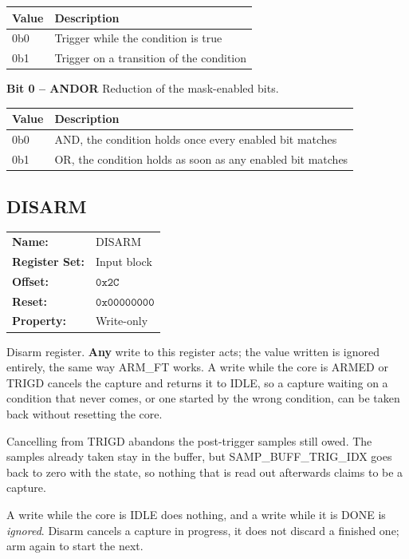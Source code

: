 \documentclass[twocolumn]{article}
\newcommand{\hex}[1]{\ensuremath{\mathtt{0x#1}}}
\newcommand{\regprop}[5]{%
  \begin{tabular}{ll}
    \textbf{Name:}         & #1 \\
    \textbf{Register Set:} & #2 \\
    \textbf{Offset:}       & #3 \\
    \textbf{Reset:}        & #4 \\
    \textbf{Property:}     & #5 \\
  \end{tabular}\par\vspace{0.6em}%
}
\begin{document}
\begin{table}[H]
    \centering
    \begin{tabularx}{\textwidth}{|l|P|}
        \hline
         \textbf{Value} & \textbf{Description} \\
        \hline
        0b0 & Trigger while the condition is true \\
        \hline
        0b1 & Trigger on a transition of the condition \\
        \hline
    \end{tabularx}
\end{table}

\noindent\textbf{Bit 0 -- ANDOR} Reduction of the mask-enabled bits.

\begin{table}[H]
    \centering
    \begin{tabularx}{\textwidth}{|l|P|}
        \hline
         \textbf{Value} & \textbf{Description} \\
        \hline
        0b0 & AND, the condition holds once every enabled bit matches \\
        \hline
        0b1 & OR, the condition holds as soon as any enabled bit matches \\
        \hline
    \end{tabularx}
\end{table}

\newpage
\subsection{DISARM}
\regprop{DISARM}{Input block}{\hex{2C}}{\hex{00000000}}{Write-only}

Disarm register. \textbf{Any} write to this register acts; the value written is ignored entirely, the same way ARM\_FT works. A write while the core is ARMED or TRIGD cancels the capture and returns it to IDLE, so a capture waiting on a condition that never comes, or one started by the wrong condition, can be taken back without resetting the core.

Cancelling from TRIGD abandons the post-trigger samples still owed. The samples already taken stay in the buffer, but SAMP\_BUFF\_TRIG\_IDX goes back to zero with the state, so nothing that is read out afterwards claims to be a capture.

A write while the core is IDLE does nothing, and a write while it is DONE is \emph{ignored}. Disarm cancels a capture in progress, it does not discard a finished one; arm again to start the next.
\end{document}
